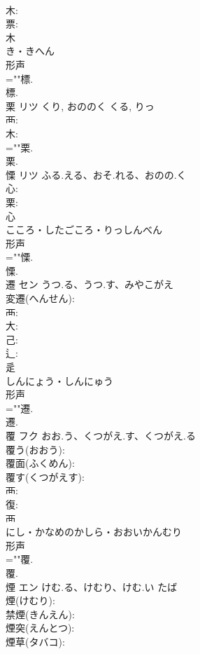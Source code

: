 \documentclass[8pt]{extreport}
\begin{document}
\begin{CJK}{UTF8}{min}
\\	木: 
\\	票: 
\\	木	
\\	き・きへん	
\\	形声 
\\	=""標.
\\	標.
\\	栗	リツ	くり, おののく	くる, りっ	
\\	襾: 
\\	木: 
\\	=""栗.
\\	栗.
\\	慄	リツ	ふる.える、おそ.れる、おのの.く		
\\	心: 
\\	栗: 
\\	心	
\\	こころ・したごころ・りっしんべん	
\\	形声 
\\	=""慄.
\\	慄.
\\	遷	セン	うつ.る、うつ.す、みやこがえ		
\\	変遷(へんせん): 
\\	襾: 
\\	大: 
\\	己: 
\\	辶: 
\\	辵	
\\	しんにょう・しんにゅう	
\\	形声 
\\	=""遷.
\\	遷.
\\	覆	フク	おお.う、くつがえ.す、くつがえ.る		
\\	覆う(おおう): 
\\	覆面(ふくめん): 
\\	覆す(くつがえす): 
\\	襾: 
\\	復: 
\\	襾	
\\	にし・かなめのかしら・おおいかんむり	
\\	形声 
\\	=""覆.
\\	覆.
\\	煙	エン	けむ.る、けむり、けむ.い	たば	
\\	煙(けむり): 
\\	禁煙(きんえん): 
\\	煙突(えんとつ): 
\\	煙草(タバコ): 

\end{CJK}
\end{document}
